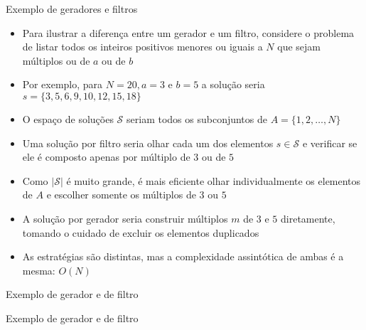 \begin{frame}[fragile]{Exemplo de geradores e filtros}

    \begin{itemize}
        \item Para ilustrar a diferença entre um gerador e um filtro, considere o problema de
            listar todos os inteiros positivos menores ou iguais a $N$ que sejam múltiplos ou
            de $a$ ou de $b$

        \item Por exemplo, para $N = 20, a = 3$ e $b = 5$ a solução seria 
            $s = \lbrace 3, 5, 6, 9, 10, 12, 15, 18\rbrace$

        \item O espaço de soluções $\mathcal{S}$ seriam todos os subconjuntos de 
            $A = \lbrace 1, 2, \ldots, N\rbrace$

        \item Uma solução por filtro seria olhar cada um dos elementos $s\in \mathcal{S}$ e 
            verificar se ele é composto apenas por múltiplo de $3$ ou de $5$

        \item Como $|\mathcal{S}|$ é muito grande, é mais eficiente olhar individualmente os
            elementos de $A$ e escolher somente os múltiplos de $3$ ou $5$
 
        \item A solução por gerador seria construir múltiplos $m$ de $3$ e $5$ diretamente, 
            tomando o cuidado de excluir os elementos duplicados

        \item As estratégias são distintas, mas a complexidade assintótica de ambas é a 
            mesma: $O(N)$
    \end{itemize}

\end{frame}

\begin{frame}[fragile]{Exemplo de gerador e de filtro}
\end{frame}

\begin{frame}[fragile]{Exemplo de gerador e de filtro}
\end{frame}
